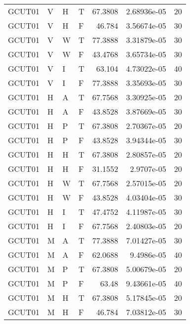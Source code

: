 \begin{longtable}{llllrrr}
    GCUT01   & V     & H     & T          & 67.3808    & 2.68936e-05 & 20       \\
    GCUT01   & V     & H     & F          & 46.784     & 3.56674e-05 & 30       \\
    GCUT01   & V     & W     & T          & 77.3888    & 3.31879e-05 & 30       \\
    GCUT01   & V     & W     & F          & 43.4768    & 3.65734e-05 & 30       \\
    GCUT01   & V     & I     & T          & 63.104     & 4.73022e-05 & 40       \\
    GCUT01   & V     & I     & F          & 77.3888    & 3.35693e-05 & 30       \\
    GCUT01   & H     & A     & T          & 67.7568    & 3.30925e-05 & 20       \\
    GCUT01   & H     & A     & F          & 43.8528    & 3.87669e-05 & 30       \\
    GCUT01   & H     & P     & T          & 67.3808    & 2.70367e-05 & 20       \\
    GCUT01   & H     & P     & F          & 43.8528    & 3.94344e-05 & 30       \\
    GCUT01   & H     & H     & T          & 67.3808    & 2.80857e-05 & 20       \\
    GCUT01   & H     & H     & F          & 31.1552    & 2.9707e-05  & 20       \\
    GCUT01   & H     & W     & T          & 67.7568    & 2.57015e-05 & 20       \\
    GCUT01   & H     & W     & F          & 43.8528    & 4.03404e-05 & 30       \\
    GCUT01   & H     & I     & T          & 47.4752    & 4.11987e-05 & 30       \\
    GCUT01   & H     & I     & F          & 67.7568    & 2.40803e-05 & 20       \\
    GCUT01   & M     & A     & T          & 77.3888    & 7.01427e-05 & 30       \\
    GCUT01   & M     & A     & F          & 62.0688    & 9.4986e-05  & 40       \\
    GCUT01   & M     & P     & T          & 67.3808    & 5.00679e-05 & 20       \\
    GCUT01   & M     & P     & F          & 63.48      & 9.43661e-05 & 40       \\
    GCUT01   & M     & H     & T          & 67.3808    & 5.17845e-05 & 20       \\
    GCUT01   & M     & H     & F          & 46.784     & 7.03812e-05 & 30       \\

\end{longtable}
